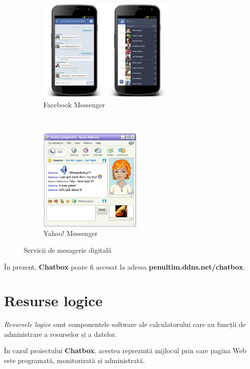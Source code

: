 \documentclass[12pt,a4paper]{article}
\begin{document}
\begin{figure}[h!]
        \centering
        \begin{subfigure}[b]{0.45\textwidth}
                \includegraphics[height=5cm]{img/fb_mess.jpg}
                \caption{Facebook Messenger}
        \end{subfigure}%
        ~ \qquad 
        \begin{subfigure}[b]{0.45\textwidth}
                \includegraphics[height=5cm]{img/yahoo_mess.jpg}
                \caption{Yahoo! Messenger}
        \end{subfigure}
        \caption{Servicii de mesagerie digitală}%
\end{figure}



În prezent, \textbf{Chatbox} poate fi accesat la adresa
\textbf{penultim.ddns.net/chatbox}.



\newpage
\section{Resurse logice}
\textit{Resursele logice} sunt componentele software ale calculatorului care au funcții de administrare a resurselor și a datelor.

În cazul proiectului \textbf{Chatbox}, acestea reprezintă mijlocul prin care
pagina Web este programată, monitorizată și administrată.
\end{document}
